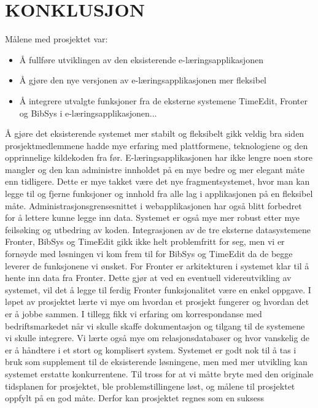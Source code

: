 \documentclass[../main.tex]{subfiles}
\begin{document}
\chapter{KONKLUSJON}

Målene med prosjektet var:
\begin{itemize}
\item Å fullføre utviklingen av den eksisterende e-læringsapplikasjonen
\item Å gjøre den nye versjonen av e-læringsapplikasjonen mer fleksibel
\item Å integrere utvalgte funksjoner fra de eksterne systemene TimeEdit, Fronter og BibSys i e-læringsapplikasjonen...
\end{itemize}
Å gjøre det eksisterende systemet mer stabilt og fleksibelt gikk veldig bra siden prosjektmedlemmene hadde mye erfaring med plattformene, teknologiene og den opprinnelige kildekoden fra før. E-læringsapplikasjonen har ikke lengre noen store mangler og den kan administre innholdet på en mye bedre og mer elegant måte enn tidligere. Dette er mye takket være det nye fragmentsystemet, hvor man kan legge til og fjerne funksjoner og innhold fra alle lag i applikasjonen på en fleksibel måte. Administrasjonsgrensesnittet i webapplikasjonen har også blitt forbedret for å lettere kunne legge inn data. Systemet er også mye mer robust etter mye feilsøking og utbedring av koden.\newline
\newline
Integrasjonen av de tre eksterne datasystemene Fronter, BibSys og TimeEdit gikk ikke helt problemfritt for seg, men vi er fornøyde med løsningen vi kom frem til for BibSys og TimeEdit da de begge leverer de funksjonene vi ønsket. For Fronter er arkitekturen i systemet klar til å hente inn data fra Fronter. Dette gjør at ved en eventuell videreutvikling av systemet, vil det å legge til ferdig Fronter funksjonalitet være en enkel oppgave.\newline
\newline
I løpet av prosjektet lærte vi mye om hvordan et prosjekt fungerer og hvordan det er å jobbe sammen. I tillegg fikk vi erfaring om korrespondanse med bedriftsmarkedet når vi skulle skaffe dokumentasjon og tilgang til de systemene vi skulle integrere. Vi lærte også mye om relasjonsdatabaser og hvor vanskelig de er å håndtere i et stort og komplisert system.\newline
\newline
Systemet er godt nok til å tas i bruk som supplement til de eksisterende løsningene, men med mer utvikling kan systemet erstatte konkurrentene.\newline
\newline
Til tross for at vi måtte bryte med den originale tidsplanen for prosjektet, ble problemstillingene løst, og målene til prosjektet oppfylt på en god måte. Derfor kan prosjektet regnes som en suksess

\newpage
\end{document}
